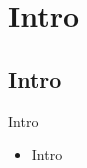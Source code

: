 \section{Intro}
\subsection{Intro}
\begin{frame}{Intro}
  \begin{itemize}
    \item Intro 
  \end{itemize}
\end{frame}

